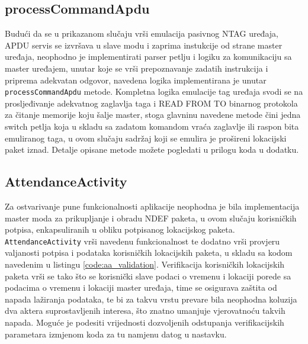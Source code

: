 \subsection{processCommandApdu}
Budući da se u prikazanom slučaju vrši emulacija pasivnog NTAG uređaja, APDU servis se izvršava u slave modu i zaprima instukcije od strane master uređaja, neophodno je implementirati parser petlju i logiku za komunikaciju sa master uređajem, unutar koje se vrši prepoznavanje zadatih instrukcija i priprema adekvatan odgovor, navedena logika implementirana je unutar \texttt{processCommandApdu} metode. Kompletna logika emulacije tag uređaja svodi se na prosljeđivanje adekvatnog zaglavlja taga i READ FROM TO binarnog protokola za čitanje memorije koju šalje master, stoga glavninu navedene metode čini jedna switch petlja koja u skladu sa zadatom komandom vraća zaglavlje ili raspon bita emuliranog taga, u ovom slučaju sadržaj koji se emulira je prošireni lokacijski paket iznad. Detalje opisane metode možete pogledati u prilogu koda u dodatku.

\subsection{AttendanceActivity}
Za ostvarivanje pune funkcionalnosti aplikacije neophodna je bila implementacija master moda za prikupljanje i obradu NDEF paketa, u ovom slučaju korisničkih potpisa, enkapsuliranih u obliku potpisanog lokacijskog paketa. \texttt{AttendanceActivity} vrši navedenu funkcionalnost te dodatno vrši provjeru valjanosti potpisa i podataka korisničkih lokacijskih paketa, u skladu sa kodom navedenim u listingu \ref{code:aa_validation}. Verifikacija korisničkih lokacijskih paketa vrši se tako što se korisnički slave podaci o vremenu i lokaciji porede sa podacima o vremenu i lokaciji master uređaja, time se osigurava zaštita od napada lažiranja podataka, te bi za takvu vrstu prevare bila neophodna koluzija dva aktera suprostavljenih interesa, što znatno umanjuje vjerovatnoću takvih napada. Moguće je podesiti vrijednosti dozvoljenih odstupanja verifikacijskih parametara izmjenom koda za tu namjenu datog u nastavku.

